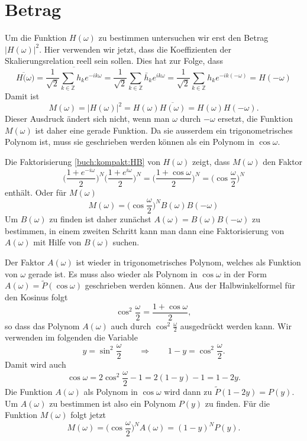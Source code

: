 %
%
%
\section{Betrag\label{section:betrag}}
Um die Funktion $H(\omega)$ zu bestimmen untersuchen wir erst den
Betrag $|H(\omega)|^2$.
Hier verwenden wir jetzt, dass die Koeffizienten der Skalierungsrelation
reell sein sollen.
Dies hat zur Folge, dass
\[
\overline{H(\omega})
=
\overline{
\frac1{\sqrt{2}}
\sum_{k\in\mathbb Z} h_ke^{-ik\omega}
}
=
\frac1{\sqrt{2}}
\sum_{k\in\mathbb Z} \bar{h}_ke^{ik\omega}
=
\frac1{\sqrt{2}}
\sum_{k\in\mathbb Z} h_ke^{-ik(-\omega)}
=
H(-\omega)
\]
Damit ist
\[
M(\omega)
=
|H(\omega)|^2
=
H(\omega)
\overline{H(\omega)}
=
H(\omega)H(-\omega).
\]
Dieser Ausdruck ändert sich nicht, wenn man $\omega$ durch $-\omega$
ersetzt, die Funktion $M(\omega)$ ist daher eine gerade Funktion.
Da sie ausserdem ein trigonometrisches Polynom ist, muss sie geschrieben
werden können als ein Polynom in $\cos\omega$.

Die Faktorisierung \eqref{buch:kompakt:HB} von $H(\omega)$
zeigt, dass $M(\omega)$ den Faktor
\[
\biggl(\frac{1+e^{-i\omega}}2\biggr)^N
\biggl(\frac{1+e^{i\omega}}2\biggr)^N
=
\biggl( \frac{1+\cos\omega}2\biggr)^N
=
\biggl(
\cos\frac{\omega}2
\biggr)^N
\]
enthält.
Oder für $M(\omega)$
\begin{equation}
M(\omega)
= 
\biggl(
\cos\frac{\omega}2
\biggr)^N
B(\omega)B(-\omega)
\label{buch:kompakt:MB}
\end{equation}
Um $B(\omega)$ zu finden ist daher zunächst
$A(\omega)=B(\omega)B(-\omega)$
zu bestimmen, in einem zweiten Schritt kann man dann eine
Faktorisierung von $A(\omega)$ mit Hilfe von $B(\omega)$ suchen.

Der Faktor $A(\omega)$ ist wieder in trigonometrisches Polynom,
welches als Funktion von $\omega$ gerade ist.
Es muss also wieder als Polynom in $\cos\omega$
in der Form $A(\omega)=\tilde{P}(\cos\omega)$
geschrieben werden können.
Aus der Halbwinkelformel für den Kosinus folgt
\[
\cos^2\frac{\omega}2
=
\frac{1+\cos\omega}2,
\]
so dass das Polynom $A(\omega)$ auch durch $\cos^2\frac{\omega}2$
ausgedrückt werden kann.
Wir verwenden im folgenden die Variable 
\[
y=\sin^2\frac{\omega}2
\qquad\Rightarrow\qquad
1-y=\cos^2\frac{\omega}2.
\]
Damit wird auch 
\[
\cos\omega
=
2\cos^2\frac{\omega}2
-1
=
2(1-y)-1
=
1-2y.
\]
Die Funktion $A(\omega)$ als Polynom in $\cos\omega$ wird
dann zu $\tilde{P}(1-2y) = P(y)$.
Um $A(\omega)$ zu bestimmen ist also ein Polynom $P(y)$ zu finden.
Für die Funktion $M(\omega)$ folgt jetzt
\[
M(\omega)
=
\biggl(\cos\frac{\omega}2\biggr)^N
A(\omega)
=
(1-y)^N P(y).
\]

